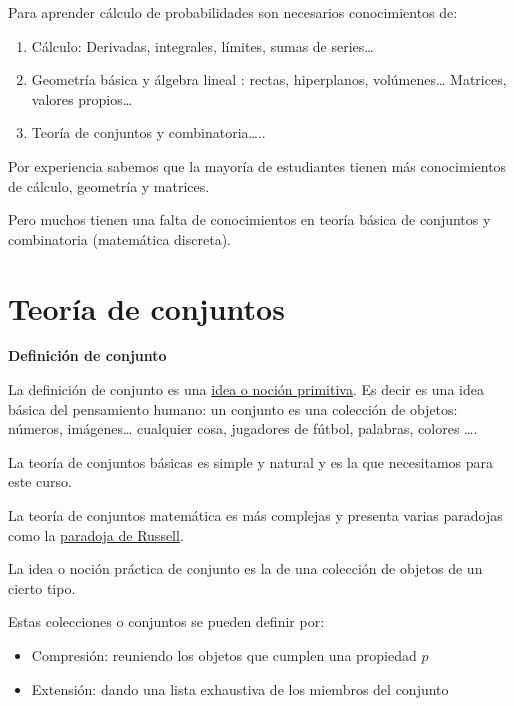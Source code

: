 \documentclass[]{book}
\providecommand{\tightlist}{%
  \setlength{\itemsep}{0pt}\setlength{\parskip}{0pt}}
\begin{document}
Para aprender cálculo de probabilidades son necesarios conocimientos de:

\begin{enumerate}
\def\labelenumi{\arabic{enumi}.}
\tightlist
\item
  Cálculo: Derivadas, integrales, límites, sumas de series\ldots{}
\item
  Geometría básica y álgebra lineal : rectas, hiperplanos, volúmenes\ldots{} Matrices, valores propios\ldots{}
\item
  Teoría de conjuntos y combinatoria\ldots{}..
\end{enumerate}

Por experiencia sabemos que la mayoría de estudiantes tienen más conocimientos de cálculo, geometría y matrices.

Pero muchos tienen una falta de conocimientos en teoría básica de conjuntos y combinatoria (matemática discreta).

\hypertarget{teoruxeda-de-conjuntos}{%
\section{Teoría de conjuntos}\label{teoruxeda-de-conjuntos}}

\textbf{Definición de conjunto}

La definición de conjunto es una \href{https://es.wikipedia.org/wiki/Concepto_primitivo}{idea o noción primitiva}. Es decir es una idea básica del pensamiento humano: un conjunto es una colección de objetos: números, imágenes\ldots{} cualquier cosa, jugadores de fútbol, palabras, colores \ldots{}.

La teoría de conjuntos básicas es simple y natural y es la que necesitamos para este curso.

La teoría de conjuntos matemática es más complejas y presenta varias paradojas como la \href{https://es.wikipedia.org/wiki/Paradoja_de_Russell}{paradoja de Russell}.

La idea o noción práctica de conjunto es la de una colección de objetos de un cierto tipo.

Estas colecciones o conjuntos se pueden definir por:

\begin{itemize}
\tightlist
\item
  Compresión: reuniendo los objetos que cumplen una propiedad \(p\)
\item
  Extensión: dando una lista exhaustiva de los miembros del conjunto
\end{itemize}
\end{document}
